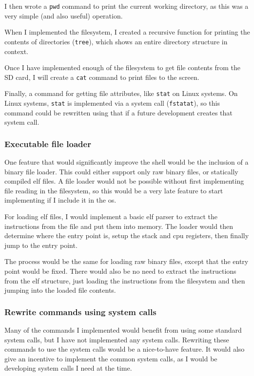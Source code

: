 \documentclass{article}
\begin{document}
I then wrote a \texttt{pwd} command to print the current working directory, as
this was a very simple (and also useful) operation.

When I implemented the filesystem, I created a recursive function for
printing the contents of directories (\texttt{tree}), which shows an entire
directory structure in context.

Once I have implemented enough of the filesystem to get file contents from the
SD card, I will create a \texttt{cat} command to print files to the screen.

Finally, a command for getting file attributes, like \texttt{stat} on Linux
systems. On Linux systems, \texttt{stat} is implemented via a system call
(\texttt{fstatat}), so this command could be rewritten using that if a future
development creates that system call.

\subsubsection{Executable file loader}
One feature that would significantly improve the shell would be the inclusion
of a binary file loader. This could either support only raw binary files, or
statically compiled \gls{elf} files. A file loader would not be possible
without first implementing file reading in the filesystem, so this would be a
very late feature to start implementing if I include it in the \gls{os}.

For loading \gls{elf} files, I would implement a basic \gls{elf} parser to
extract the instructions from the file and put them into memory. The loader
would then determine where the entry point is, setup the stack and \gls{cpu}
registers, then finally jump to the entry point.

The process would be the same for loading raw binary files, except that the
entry point would be fixed. There would also be no need to extract the
instructions from the \gls{elf} structure, just loading the instructions from
the filesystem and then jumping into the loaded file contents.

\subsubsection{Rewrite commands using system calls}
Many of the commands I implemented would benefit from using some standard
system calls, but I have not implemented any system calls. Rewriting these
commands to use the system calls would be a nice-to-have feature. It would also
give an incentive to implement the common system calls, as I would be
developing system calls I need at the time.
\end{document}
